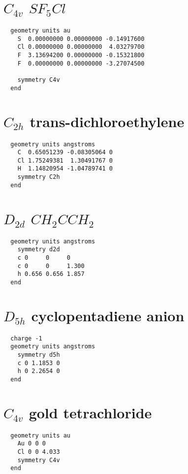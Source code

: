   \section{\protect$C_{4v}$ \protect$SF_5Cl$}

\begin{verbatim}
  geometry units au
    S  0.00000000 0.00000000 -0.14917600 
    Cl 0.00000000 0.00000000  4.03279700 
    F  3.13694200 0.00000000 -0.15321800 
    F  0.00000000 0.00000000 -3.27074500 

    symmetry C4v
  end
\end{verbatim}

  \section{\protect$C_{2h}$ trans-dichloroethylene}
\begin{verbatim}
  geometry units angstroms
    C  0.65051239 -0.08305064 0 
    Cl 1.75249381  1.30491767 0 
    H  1.14820954 -1.04789741 0 
    symmetry C2h
  end
\end{verbatim}

  \section{\protect$D_{2d}$ \protect$CH_2CCH_2$}
\begin{verbatim}
  geometry units angstroms
    symmetry d2d
    c 0     0     0 
    c 0     0     1.300 
    h 0.656 0.656 1.857 
  end
\end{verbatim}

  \section{\protect$D_{5h}$ cyclopentadiene anion}
\begin{verbatim}
  charge -1
  geometry units angstroms
    symmetry d5h
    c 0 1.1853 0 
    h 0 2.2654 0 
  end
\end{verbatim}


  \section{\protect$C_{4v}$ gold tetrachloride}

\begin{verbatim}
  geometry units au
    Au 0 0 0 
    Cl 0 0 4.033
    symmetry C4v
  end
\end{verbatim}
